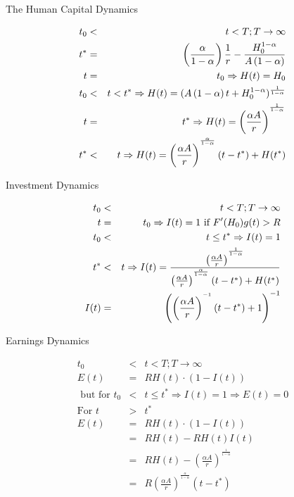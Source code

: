\documentclass{article}
\numberwithin{equation}{section}
\begin{document}
\bigskip The Human Capital Dynamics

\begin{eqnarray*}
t_{0} &<&t<T;T\rightarrow \infty \\
t^{\ast } &=&\left( \frac{\alpha }{1-\alpha }\right) \frac{1}{r}-\frac{%
H_{0}^{1-\alpha }}{A\left( 1-\alpha \right) } \\
t &=&t_{0}\Rightarrow H(t)=H_{0} \\
t_{0} &<&t<t^{\ast }\Rightarrow H(t)=(A\left( 1-\alpha \right)
t+H_{0}^{1-\alpha })^{\frac{1}{1-\alpha }} \\
t &=&t^{\ast }\Rightarrow H(t)=\left( \frac{\alpha A}{r}\right) ^{^{\frac{1}{%
1-\alpha }}} \\
t^{\ast } &<&t\Rightarrow H(t)=\left( \frac{\alpha A}{r}\right) ^{^{\frac{%
\alpha }{1-\alpha }}}\left( t-t^{\ast }\right) +H(t^{\ast })
\end{eqnarray*}

\pagebreak \bigskip

Investment Dynamics

\begin{eqnarray*}
t_{0} &<&t<T;T\rightarrow \infty \\
t &=&t_{0}\Rightarrow I(t)=1\text{ if }F^{\prime }(H_{0})g(t)>R \\
t_{0} &<&t\leq t^{\ast }\Rightarrow I(t)=1 \\
t^{\ast } &<&t\Rightarrow I(t)=\frac{\left( \frac{\alpha A}{r}\right) ^{^{%
\frac{1}{1-\alpha }}}}{\left( \frac{\alpha A}{r}\right) ^{^{\frac{\alpha }{%
1-\alpha }}}\left( t-t^{\ast }\right) +H(t^{\ast })} \\
I(t) &=&\left( \left( \frac{\alpha A}{r}\right) ^{^{-1}}\left( t-t^{\ast
}\right) +1\right) ^{-1}
\end{eqnarray*}

\pagebreak \bigskip

Earnings Dynamics

\begin{eqnarray*}
t_{0} &<&t<T;T\rightarrow \infty  \\
E(t) &=&RH(t)\cdot (1-I(t)) \\
\text{ but for }t_{0} &<&t\leq t^{\ast }\Rightarrow I(t)=1\Rightarrow E(t)=0
\\
\text{For }t &>&t^{\ast } \\
E(t) &=&RH(t)\cdot (1-I(t)) \\
&=&RH(t)-RH(t)I(t) \\
&=&RH(t)-\left( \frac{\alpha A}{r}\right) ^{^{\frac{1}{1-\alpha }}} \\
&=&R\left( \frac{\alpha A}{r}\right) ^{^{\frac{\alpha }{1-\alpha }}}\left(
t-t^{\ast }\right) 
\end{eqnarray*}
\end{document}
